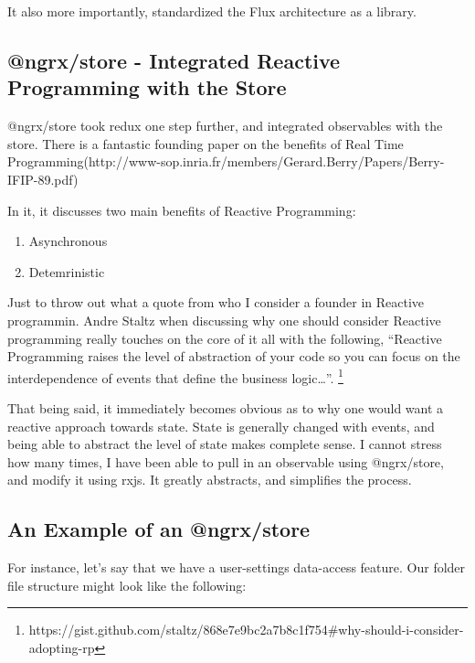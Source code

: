 It also more importantly, standardized the Flux architecture as a library.

\subsection{@ngrx/store - Integrated Reactive Programming with the Store}
@ngrx/store took redux one step further, and integrated observables with the
store. There is a fantastic founding paper on the benefits of Real Time
Programming(http://www-sop.inria.fr/members/Gerard.Berry/Papers/Berry-IFIP-89.pdf)

In it, it discusses two main benefits of Reactive Programming:
\begin{enumerate}
  \item Asynchronous
  \item Detemrinistic
\end{enumerate}

Just to throw out what a quote from who I consider a founder in Reactive
programmin. Andre Staltz when discussing why one should consider Reactive
programming really touches on the core of it all with the following, “Reactive
Programming raises the level of abstraction of your code so you can focus on the interdependence of events that define the business logic…”.
\footnote{https://gist.github.com/staltz/868e7e9bc2a7b8c1f754\#why-should-i-consider-adopting-rp}

That being said, it immediately becomes obvious as to why one would want a
reactive approach towards state. State is generally changed with events, and
being able to abstract the level of state makes complete sense. I cannot stress
how many times, I have been able to pull in an observable using @ngrx/store, and
modify it using rxjs. It greatly abstracts, and simplifies the process.


\subsection{ An Example of an @ngrx/store }

For instance, let's say that we have a user-settings data-access feature. Our
folder file structure might look like the following:

